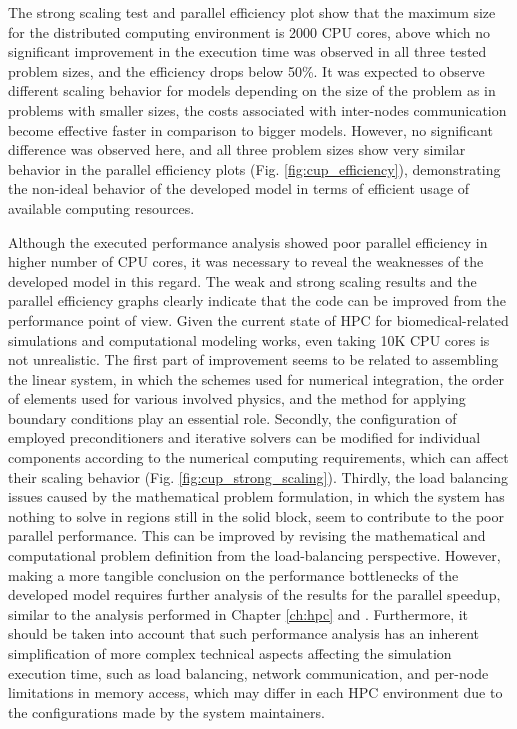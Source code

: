The strong scaling test and parallel efficiency plot show that the maximum size for the distributed computing environment is \num{2000} {CPU} cores, above which no significant improvement in the execution time was observed in all three tested problem sizes, and the efficiency drops below 50\%. It was expected to observe different scaling behavior for models depending on the size of the problem as in problems with smaller sizes, the costs associated with inter-nodes communication become effective faster in comparison to bigger models. However, no significant difference was observed here, and all three problem sizes show very similar behavior in the parallel efficiency plots (Fig. \ref{fig:cup_efficiency}), demonstrating the non-ideal behavior of the developed model in terms of efficient usage of available computing resources.

Although the executed performance analysis showed poor parallel efficiency in higher number of {CPU} cores, it was necessary to reveal the weaknesses of the developed model in this regard. The weak and strong scaling results and the parallel efficiency graphs clearly indicate that the code can be improved from the performance point of view. Given the current state of {HPC} for biomedical-related simulations and computational modeling works,  even taking 10K {CPU} cores is not unrealistic. The first part of improvement seems to be related to assembling the linear system, in which the schemes used for numerical integration, the order of elements used for various involved physics, and the method for applying boundary conditions play an essential role. Secondly, the configuration of employed preconditioners and iterative solvers can be modified for individual components according to the numerical computing requirements, which can affect their scaling behavior (Fig. \ref{fig:cup_strong_scaling}). Thirdly, the load balancing issues caused by the mathematical problem formulation, in which the system has nothing to solve in regions still in the solid block, seem to contribute to the poor parallel performance. This can be improved by revising the mathematical and computational problem definition from the load-balancing perspective. However, making a more tangible conclusion on the performance bottlenecks of the developed model requires further analysis of the results for the parallel speedup, similar to the analysis performed in Chapter \ref{ch:hpc} and \cite{Barzegari2022}. Furthermore, it should be taken into account that such performance analysis has an inherent simplification of more complex technical aspects affecting the simulation execution time, such as load balancing, network communication, and per-node limitations in memory access, which may differ in each {HPC} environment due to the configurations made by the system maintainers.


